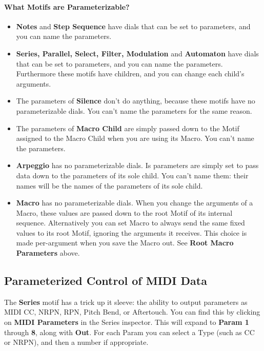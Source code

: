 \documentclass[twoside,10pt]{article}
\begin{document}
\paragraph{What Motifs are Parameterizable?}

\begin{itemize}
\item {\bf Notes} and {\bf Step Sequence} have dials that can be set to parameters, and you can name the parameters.
\item {\bf Series, Parallel, Select, Filter, Modulation} and {\bf Automaton} have dials that can be set to parameters, and you can name the parameters.  Furthermore these motifs have children, and you can change each child's arguments.
\item The parameters of {\bf Silence} don't do anything, because these motifs have no parameterizable dials.    You can't name the parameters for the same reason.
\item The parameters of {\bf Macro Child} are simply passed down to the Motif assigned to the Macro Child when you are using its Macro.  You can't name the parameters.
\item {\bf Arpeggio} has no parameterizable dials.   Is parameters are simply set to pass data down to the parameters of its sole child.  You can't name them: their names will be the names of the parameters of its sole child.
\item {\bf Macro} has no parameterizable dials.  When you change the arguments of a Macro, these values are passed down to the root Motif of its internal sequence.  Alternatively you can set Macro to always send the same fixed values to its root Motif, ignoring the arguments it receives.  This choice is made per-argument when you save the Macro out.  See {\bf Root Macro Parameters} above.
\end{itemize}

\subsection{Parameterized Control of MIDI Data}
\label{mididata}

The {\bf Series} motif has a trick up it sleeve: the ability to output parameters as MIDI CC, NRPN, RPN, Pitch Bend, or Aftertouch. You can find this by clicking on {\bf MIDI Parameters} in the Series inspector.  This will expand to {\bf Param 1} through {\bf 8}, along with {\bf Out}.  For each Param you can select a Type (such as CC or NRPN), and then a number if appropriate.  
\end{document}
